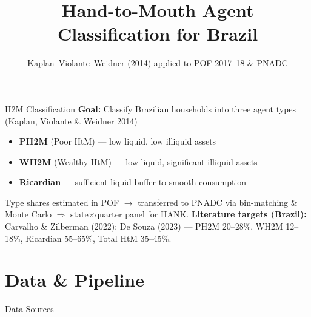 \documentclass{beamer}
\title{Hand-to-Mouth Agent Classification for Brazil}
\subtitle{Kaplan--Violante--Weidner (2014) applied to POF 2017--18 \& PNADC}
\author{}
\institute{}
\date{}
\begin{document}
\begin{frame}
  \titlepage
\end{frame}

\begin{frame}{H2M Classification}
  \textbf{Goal:} Classify Brazilian households into three agent types (Kaplan, Violante \& Weidner 2014)
  \begin{itemize}
    \item \textbf{PH2M} (Poor HtM) --- low liquid, low illiquid assets
    \item \textbf{WH2M} (Wealthy HtM) --- low liquid, significant illiquid assets
    \item \textbf{Ricardian} --- sufficient liquid buffer to smooth consumption
  \end{itemize}
  \vspace{0.5em}
  Type shares estimated in POF $\to$ transferred to PNADC via bin-matching \& Monte Carlo $\Rightarrow$ state$\times$quarter panel for HANK.
  \vspace{0.5em}
  \textbf{Literature targets (Brazil):} Carvalho \& Zilberman (2022); De Souza (2023) --- PH2M 20--28\%, WH2M 12--18\%, Ricardian 55--65\%, Total HtM 35--45\%.
\end{frame}

\section{Data \& Pipeline}

\begin{frame}{Data Sources}
  \begin{table}
    \scriptsize
  \end{table}
\end{frame}
\end{document}
